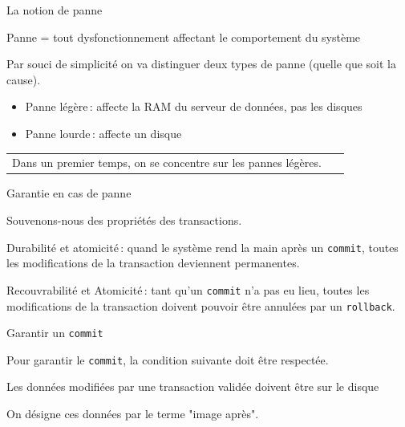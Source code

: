 


\begin{frame}{La notion de panne}

Panne = tout dysfonctionnement affectant le comportement du système

\vfill

Par souci de simplicité on va distinguer deux types de panne (quelle
que soit la cause).

\begin{itemize}
  \item \alert{Panne légère}\,: affecte la RAM du serveur de données, pas les disques
  \item \alert{Panne lourde}\,: affecte un disque
\end{itemize}

\vfill

\begin{tabular}{p{9cm}p{5cm}}
\alert{Dans un premier temps, on se concentre sur les pannes légères.}
&
~
\end{tabular}

\end{frame}


\begin{frame}{Garantie en cas de panne}

Souvenons-nous des propriétés des transactions. 

\vfill
\begin{block}{}
\alert{Durabilité et atomicité}\,: quand le système rend la main après un \texttt{commit},
\alert{toutes} les modifications de la transaction deviennent  \alert{permanentes}.
\end{block}
\vfill
\begin{block}{}
\alert{Recouvrabilité et Atomicité}\,: tant qu'un \texttt{commit} n'a pas eu lieu, 
\alert{toutes} les modifications de la transaction doivent pouvoir être   \alert{annulées}
par un \texttt{rollback}.
\end{block}
\end{frame}


\begin{frame}{Garantir un \texttt{commit}}

Pour garantir le \texttt{commit}, la condition suivante doit être respectée.
\vfill

\centerline{\alert{Les données modifiées par une transaction validée doivent
être sur le disque}}

\vfill


On désigne  ces données par le terme "image après".

\end{frame}


